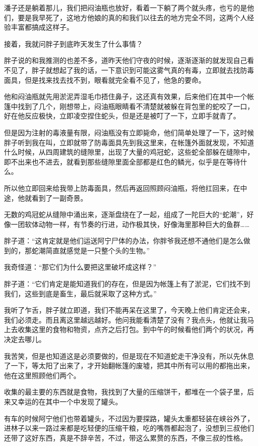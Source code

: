 潘子还是躺着那儿，我们把闷油瓶也放好，看着一下躺了两个就头疼，也亏的是他们，要是我早死了，这地方他娘的真的和我们以往去的地方完全不同，这两个人经验丰富都搞成这样子。

接着，我就问胖子到底昨天发生了什么事情？

胖子说的和我推测的也差不多，道昨天他们守夜的时候，逐渐逐渐的就发现自己看不见了，胖子就想起了我的话，一下意识到可能这雾气真的有毒，立即就去找防毒面具，但是找来找去找不到，眼看就完全看不见了，他急的要命。

他和闷油瓶就先用淤泥弄湿毛巾捂住鼻子，这还真有效果，后来他们在其中一个帐篷中找到了几个，刚想带上，闷油瓶眼睛看不清楚就被躲在背包里的蛇咬了一口，好在他反应极快，立即凌空捏住蛇头，但是还是被叮了一下，立即手就青了。

但是因为注射的毒液量有限，闷油瓶没有立即毙命，他们简单处理了一下，这时候胖子听到我在叫，立即就带了防毒面具先到我这里来，在帐篷外面就发现，不知道什么时候，从四周建筑的缝隙里，出现了大量的鸡冠蛇，这些蛇全部躲在缝隙中，即不出来也不进去，就看到那些缝隙里面全部都是红色的鳞光，似乎是在等待什么。

所以他立即回来给我带上防毒面具，然后再返回照顾闷油瓶，将他扛回来，在中途，他就看到了一副奇景。

无数的鸡冠蛇从缝隙中涌出来，逐渐盘绕在了一起，组成了一陀巨大的“蛇潮”，好像一团软体动物一样，有节奏的行进，动作极其快，好像海里那种巨大的鱼群……

胖子道：“这肯定就是他们运送阿宁尸体的办法，你胖爷我还想不通他们是怎么做到的，那蛇潮简直就感觉是一只整个头的生物。”

我奇怪道：“那它们为什么要把这里破坏成这样？”

胖子道：“它们肯定是能知道我们的存在，但是因为帐篷上有了淤泥，它们找不到我们，这些到底是畜生，最后就采取了这种方式。”

我听了乍舌，胖子就立即道，我们不能再呆在这里了，今天晚上他们肯定还会来，我们必须走。而且离这里越远越好。他问我能看清楚了没有？我点头，他就让我马上去收集这里的食物和物资，点齐之后打包。到中午的时候看他们两个的状况，再决定去哪儿。

我苦笑，但是也知道这是必须要做的，但是现在不知道蛇走干净没有，所以先休息了一下，等太阳了出来了，才开始翻帐篷的废墟，把其中所有可以用的都拖出来，他在这里照顾他们两个。

收集的最主要的东西就是食物，我找到了大量的压缩饼干，都堆在一个袋子里，后来又幸运的在其中一个中发现了罐头。

有车的时候阿宁他们也带着罐头，不过因为要探路，罐头太重都轻装在峡谷外了，进林子以来一路过来都是吃轻便的压缩干粮，吃的嘴唇都起泡了，没想到三叔他们还带了这好东西，真是不辞辛苦，不过，带这么累赘的东西，不像三叔的性格。

